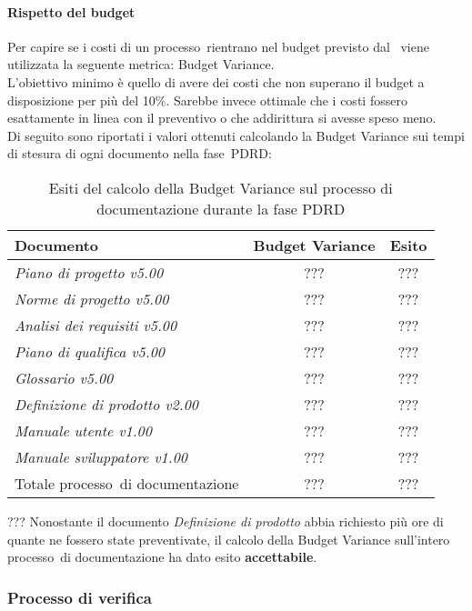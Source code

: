 \documentclass[../PianoDiQualifica.tex]{subfiles}
\begin{document}
\begin{appendices}
			\paragraph{Rispetto del budget}
			Per capire se i costi di un processo\g\ rientrano nel budget previsto dal \pianodiprogetto\ viene utilizzata la seguente metrica: Budget Variance.\\
			L'obiettivo minimo è quello di avere dei costi che non superano il budget a disposizione per più del 10\%. Sarebbe invece ottimale che i costi fossero esattamente in linea con il preventivo o che addirittura si avesse speso meno.\\
			Di seguito sono riportati i valori ottenuti calcolando la Budget Variance sui tempi di stesura di ogni documento nella fase\g\ PDRD:
			\begin{table}[H]
				\centering
				\begin{tabular}{l * {2}{c}}
					\toprule
					\textbf{Documento} & \textbf{Budget Variance} & \textbf{Esito} \\
					\midrule
					\textit{Piano di progetto v5.00} & ??? &  ??? \\
					\textit{Norme di progetto v5.00} & ??? & ??? \\
					\textit{Analisi dei requisiti v5.00} & ??? & ??? \\
					\textit{Piano di qualifica v5.00} & ??? & ??? \\
					\textit{Glossario v5.00} & ??? & ??? \\
					\textit{Definizione di prodotto v2.00} & ??? & ??? \\
					\textit{Manuale utente v1.00} & ??? & ??? \\
					\textit{Manuale sviluppatore v1.00} & ??? & ??? \\
					Totale processo\g\ di documentazione & ??? & ??? \\
					\bottomrule
				\end{tabular}
				\caption{Esiti del calcolo della Budget Variance sul processo di documentazione durante la fase PDRD}
				\label{tab:esiti_budget_variance}
			\end{table}
			
			??? Nonostante il documento \textit{Definizione di prodotto} abbia richiesto più ore di quante ne fossero state preventivate, il calcolo della Budget Variance sull'intero processo\g\ di documentazione ha dato esito \textbf{accettabile}.
						
		\subsubsection{Processo di verifica}

\end{appendices}
\end{document}
